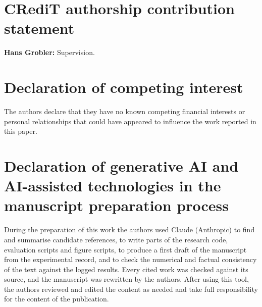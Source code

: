 \section*{CRediT authorship contribution statement}
\textbf{Hans Grobler:} Supervision.

\section*{Declaration of competing interest}
The authors declare that they have no known competing financial interests or personal relationships that could have appeared to influence the work reported in this paper.


\section*{Declaration of generative AI and AI-assisted technologies in the manuscript preparation process}
During the preparation of this work the authors used Claude (Anthropic) to find and summarise candidate references,
to write parts of the research code, evaluation scripts and figure scripts,
to produce a first draft of the manuscript from the experimental record, and to check the numerical
and factual consistency of the text against the logged results.
Every cited work was checked against its source, and the manuscript was rewritten by the authors.
After using this tool, the authors reviewed and edited the content as needed
and take full responsibility for the content of the publication.
